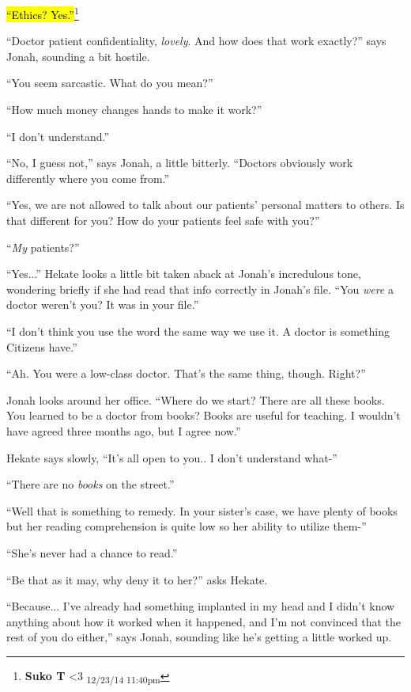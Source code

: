 \hl{``Ethics?  Yes.''}\footnote{\textbf{Suko T }\textless 3 \textsubscript{12/23/14 11:40pm}}

``Doctor patient confidentiality, \textit{lovely}.  And how does that work exactly?'' says Jonah, sounding a bit hostile.

``You seem sarcastic.  What do you mean?''

``How much money changes hands to make it work?''

``I don't understand.''

``No, I guess not,'' says Jonah, a little bitterly.  ``Doctors obviously work differently where you come from.''

``Yes, we are not allowed to talk about our patients' personal matters to others.  Is that different for you?  How do your patients feel safe with you?''

``\textit{My} patients?''

``Yes...'' Hekate looks a little bit taken aback at Jonah's incredulous tone, wondering briefly if she had read that info correctly in Jonah's file.  ``You \textit{were }a doctor weren't you?  It was in your file.''

``I don't think you use the word the same way we use it.  A doctor is something Citizens have.''

``Ah.  You were a low-class doctor.  That's the same thing, though.  Right?''



Jonah looks around her office.  ``Where do we start?  There are all these books.  You learned to be a doctor from books?  Books are useful for teaching.  I wouldn't have agreed three months ago, but I agree now.''

Hekate says slowly, ``It's all open to you..  I don't understand what-''

``There are no \textit{books} on the street.''

``Well that is something to remedy.  In your sister's case, we have plenty of books but her reading comprehension is quite low so her ability to utilize them-''

``She's never had a chance to read.''

``Be that as it may, why deny it to her?'' asks Hekate.

``Because... I've already had something implanted in my head and I didn't know anything about how it worked when it happened, and I'm not convinced that the rest of you do either,'' says Jonah, sounding like he's getting a little worked up.

